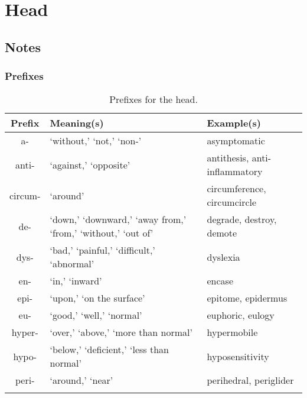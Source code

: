 %
%
%
\chapter{Head}
\label{Head} %








\abstract{}


\section{Notes}
\label{sec:NOTE3}


\subsection{Prefixes}

\begin{longtable}{c | p{} | p{}}
    \caption{Prefixes for the head.}
    \hline
    Prefix & Meaning(s) & Example(s) \\ \hline
        a- & `without,' `not,' `non-' & asymptomatic \\
        anti- & `against,' `opposite' & antithesis, anti-inflammatory \\
        circum- & `around' & circumference, circumcircle \\
        de- & `down,' `downward,' `away from,' `from,' `without,' `out of' & degrade, destroy, demote \\
        dys- & `bad,' `painful,' `difficult,' `abnormal' & dyslexia \\
        en- & `in,' `inward' & encase \\
        epi- & `upon,' `on the surface' & epitome, epidermus \\
        eu- & `good,' `well,' `normal' & euphoric, eulogy \\
        hyper- & `over,' `above,' `more than normal' & hypermobile \\
        hypo- & `below,' `deficient,' `less than normal' & hyposensitivity \\
        peri- & `around,' `near' & perihedral, periglider \\
    \label{tab:Ch3Prefix}
\end{longtable}



